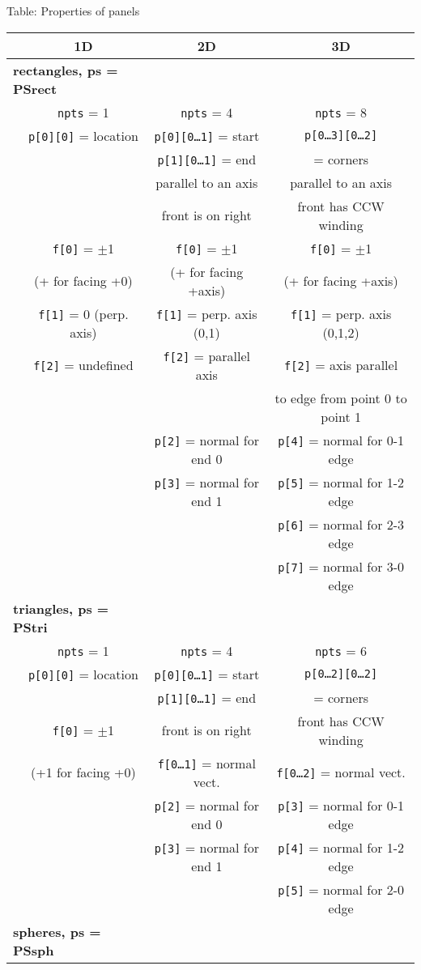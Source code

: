 \documentclass {scrbook}
\newcommand {\ttt} {\texttt}
\begin{document}
Table: Properties of panels

\begin{longtable}[c]{lccc}
&1D&2D&3D\\
\hline
\multicolumn{2}{l}{\textbf{rectangles, ps = PSrect}}\\
&\ttt{npts} = 1&\ttt{npts} = 4&\ttt{npts} = 8\\ 
&\ttt{p[0][0]} = location&\ttt{p[0][0\ldots1]} = start&\ttt{p[0\ldots3][0\ldots2]}\\ 
&&\ttt{p[1][0\ldots1]} = end&= corners\\ 
&&parallel to an axis&parallel to an axis\\ 
&&front is on right&front has CCW winding\\ 
&\ttt{f[0]} = $\pm$1&\ttt{f[0]} = $\pm$1&\ttt{f[0]} = $\pm$1\\ 
&(+ for facing +0)&(+ for facing +axis)&(+ for facing +axis)\\ 
&\ttt{f[1]} = 0 (perp. axis)&\ttt{f[1]} = perp. axis (0,1)&\ttt{f[1]} = perp. axis (0,1,2)\\ 
&\ttt{f[2]} = undefined&\ttt{f[2]} = parallel axis&\ttt{f[2]} = axis parallel\\ 
&&&to edge from point 0 to point 1\\
&&\ttt{p[2]} = normal for end 0&\ttt{p[4]} = normal for 0-1 edge\\
&&\ttt{p[3]} = normal for end 1&\ttt{p[5]} = normal for 1-2 edge\\
&&&\ttt{p[6]} = normal for 2-3 edge\\
&&&\ttt{p[7]} = normal for 3-0 edge\\
\hline
\multicolumn{2}{l}{\textbf{triangles, ps = PStri}}\\
&\ttt{npts} = 1&\ttt{npts} = 4&\ttt{npts} = 6\\ 
&\ttt{p[0][0]} = location&\ttt{p[0][0\ldots1]} = start&\ttt{p[0\ldots2][0\ldots2]}\\ 
&&\ttt{p[1][0\ldots1]} = end&= corners\\ 
&\ttt{f[0]} = $\pm$1&front is on right&front has CCW winding\\ 
&(+1 for facing +0)&\ttt{f[0\ldots1]} = normal vect.&\ttt{f[0\ldots2]} = normal vect.\\
&&\ttt{p[2]} = normal for end 0&\ttt{p[3]} = normal for 0-1 edge\\
&&\ttt{p[3]} = normal for end 1&\ttt{p[4]} = normal for 1-2 edge\\
&&&\ttt{p[5]} = normal for 2-0 edge\\
\hline
\multicolumn{2}{l}{\textbf{spheres, ps = PSsph}}\\

\end{longtable}
\end{document}
